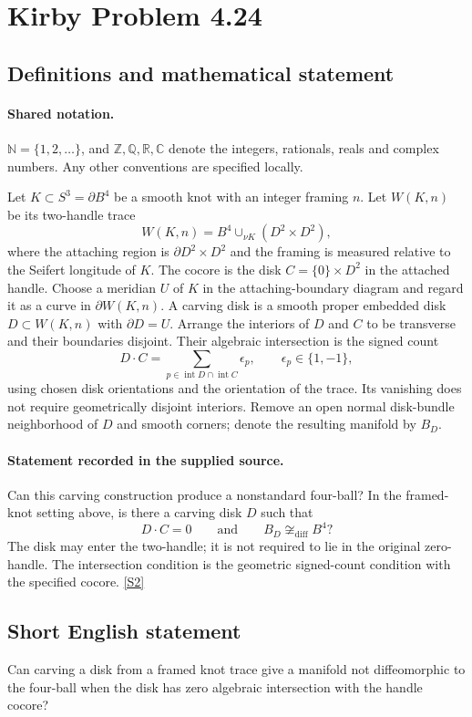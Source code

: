\documentclass[11pt]{article}
\newcommand{\sref}[2]{\hyperlink{source:#1:#2}{[S#2]}}
\begin{document}
\section{Kirby Problem 4.24}\label{statement}

\subsection{Definitions and mathematical statement}

\paragraph{Shared notation.}$\mathbb N=\{1,2,\ldots\}$, and $\mathbb Z,\mathbb Q,\mathbb R,\mathbb C$ denote the integers, rationals, reals and complex numbers. Any other conventions are specified locally.


Let $K\subset S^3=\partial B^4$ be a smooth knot with an integer framing $n$. Let $W(K,n)$ be its two-handle trace
\[
W(K,n)=B^4\cup_{\nu K}(D^2\times D^2),
\]
where the attaching region is $\partial D^2\times D^2$ and the framing is measured relative to the Seifert longitude of $K$. The cocore is the disk $C=\{0\}\times D^2$ in the attached handle. Choose a meridian $U$ of $K$ in the attaching-boundary diagram and regard it as a curve in $\partial W(K,n)$. A carving disk is a smooth proper embedded disk $D\subset W(K,n)$ with $\partial D=U$. Arrange the interiors of $D$ and $C$ to be transverse and their boundaries disjoint. Their algebraic intersection is the signed count
\[
D\cdot C=\sum_{p\in\operatorname{int}D\cap\operatorname{int}C}\epsilon_p,
\qquad\epsilon_p\in\{1,-1\},
\]
using chosen disk orientations and the orientation of the trace. Its vanishing does not require geometrically disjoint interiors. Remove an open normal disk-bundle neighborhood of $D$ and smooth corners; denote the resulting manifold by $B_D$.
\paragraph{Statement recorded in the supplied source.}
Can this carving construction produce a nonstandard four-ball? In the framed-knot setting above, is there a carving disk $D$ such that
\[
D\cdot C=0\qquad\text{and}\qquad B_D\not\cong_{\mathrm{diff}}B^4?
\]
The disk may enter the two-handle; it is not required to lie in the original zero-handle. The intersection condition is the geometric signed-count condition with the specified cocore. \sref{statement}{2}
\subsection{Short English statement}
Can carving a disk from a framed knot trace give a manifold not diffeomorphic to the four-ball when the disk has zero algebraic intersection with the handle cocore?
\end{document}
